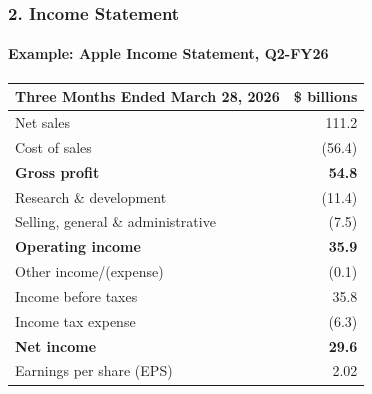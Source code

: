 \documentclass{beamer}
\begin{document}
\begin{frame}[t]
    \frametitle{2. Income Statement}
    \framesubtitle{Example: Apple Income Statement, Q2-FY26}

    
    
    \begin{table}
        \centering
    \footnotesize
    \begin{tabular}{lr}
            \toprule
            \textbf{Three Months Ended March 28, 2026} & \textbf{\$ billions} \\
            \midrule
            Net sales & 111.2 \\
            Cost of sales & (56.4) \\
            \midrule
            \textbf{Gross profit} & \textbf{54.8} \\
            Research \& development & (11.4) \\
            Selling, general \& administrative & (7.5) \\
            \midrule
            \textbf{Operating income} & \textbf{35.9} \\
            Other income/(expense) & (0.1) \\
            \midrule
            Income before taxes & 35.8 \\
            Income tax expense & (6.3) \\
            \midrule
            \textbf{Net income} & \textbf{29.6} \\
            Earnings per share (EPS) & 2.02 \\
            \bottomrule
        \end{tabular}
    \end{table}

    \vspace{0.5em}

    
\end{frame}
\end{document}
